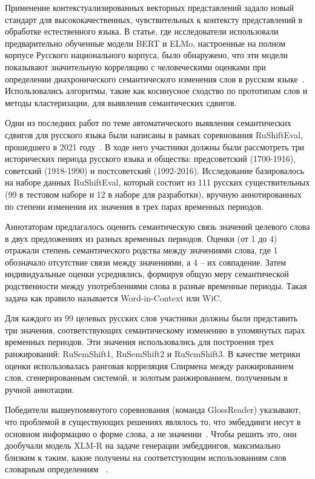 \documentclass[LI,VKR]{HSEUniversity}
\begin{document}
Применение контекстуализированных векторных представлений задало новый стандарт для
высококачественных, чувствительных к контексту представлений в обработке естественного языка.
В статье, где исследователи использовали предварительно обученные модели BERT и ELMo,
настроенные на полном корпусе Русского национального корпуса, было обнаружено,
что эти модели показывают значительную корреляцию с человеческими оценками
при определении диахронического семантического изменения слов в русском языке~\cite{rodina2020elmo}.
Использовались алгоритмы, такие как косинусное сходство по прототипам слов и методы кластеризации,
для выявления семантических сдвигов.

Одни из последних работ по теме автоматического выявления семантических сдвигов для русского языка
были написаны в рамках соревнования RuShiftEval, прошедшего в 2021 году~\cite{rushifteval}.
В ходе него участники должны были рассмотреть три исторических периода русского языка и общества:
предсоветский (1700-1916), советский (1918-1990) и постсоветский (1992-2016).
Исследование базировалось на наборе данных RuShiftEval, который состоит из
111 русских существительных (99 в тестовом наборе и 12 в наборе для разработки),
вручную аннотированных по степени изменения их значения в трех парах временных периодов.

Аннотаторам предлагалось оценить семантическую связь значений целевого слова в двух предложениях
из разных временных периодов.
Оценки (от 1 до 4) отражали степень семантического родства между значениями слова, где
1 обозначало отсутствие связи между значениями, а 4 – их совпадение.
Затем индивидуальные оценки усреднялись, формируя общую меру семантической родственности между
употреблениями слова в разные временные периоды.
Такая задача как правило называется Word-in-Context или WiC.

Для каждого из 99 целевых русских слов участники должны
были представить три значения, соответствующих семантическому изменению в упомянутых парах
временных периодов.
Эти значения использовались для построения трех ранжирований:
RuSemShift1, RuSemShift2 и RuSemShift3.
В качестве метрики оценки использовалась ранговая корреляция Спирмена между ранжированием слов,
сгенерированным системой, и золотым ранжированием, полученным в ручной аннотации.

Победители вышеупомянутого соревнования (команда GlossReader) указывают,
что проблемой в существующих решениях являлось то,
что эмбеддинги несут в основном информацию о форме слова, а не значении~\cite{GlossReader}.
Чтобы решить это, они дообучали модель XLM-R на задаче генерации эмбеддингов, максимально близким
к таким, какие получены на соответстующим использованиям слов словарным определениям
~\cite{XLM-R}.
\end{document}
